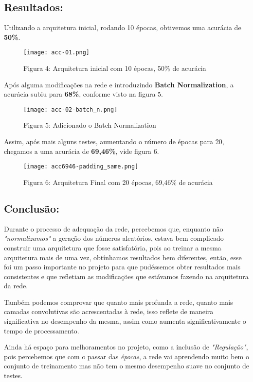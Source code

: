    \subsection{Resultados:}\label{resultados}

    Utilizando a arquitetura inicial, rodando 10 épocas, obtivemos uma acurácia de \textbf{50\%}.

\begin{figure}[ht]
\centering
\texttt{[image: acc-01.png]}
\caption{Figura 4: Arquitetura inicial com 10 épocas, 50\% de acurácia}
\end{figure}

Após alguma modificações na rede e introduzindo \textbf{Batch Normalization}, a acurácia subiu para
\textbf{68\%}, conforme visto na figura 5.

\begin{figure}[ht]
\centering
\texttt{[image: acc-02-batch\_n.png]}
\caption{Figura 5: Adicionado o Batch Normalization}
\end{figure}


Assim, após mais alguns testes, aumentando o número de épocas para 20,
chegamos a uma acurácia de \textbf{69,46\%}, vide figura 6.

\begin{figure}[H]
\centering
\texttt{[image: acc6946-padding\_same.png]}
\caption{Figura 6: Arquitetura Final com 20 épocas, 69,46\% de acurácia}
\end{figure}


    \subsection{Conclusão:}\label{conclusao}

Durante o processo de adequação da rede, percebemos que, enquanto não \emph{"normalizamos"}
a geração dos números aleatórios, estava bem complicado construir uma arquitetura
que fosse satisfatória, pois ao treinar a mesma arquitetura mais de uma vez, obtínhamos
resultados bem diferentes, então, esse foi um passo importante no projeto para que
pudéssemos obter resultados mais consistentes e que refletiam as modificações que
estávamos fazendo na arquitetura da rede.

Também podemos comprovar que quanto mais profunda a rede, quanto mais camadas convolutivas
são acrescentadas à rede, isso reflete de maneira significativa no desempenho da mesma,
assim como aumenta significativamente o tempo de processamento.

Ainda há espaço para melhoramentos no projeto, como a inclusão de \emph{"Regulação"}, pois
percebemos que com o passar das \emph{épocas}, a rede vai aprendendo muito bem o conjunto
de treinamento mas não tem o mesmo desempenho suave no conjunto de testes.

